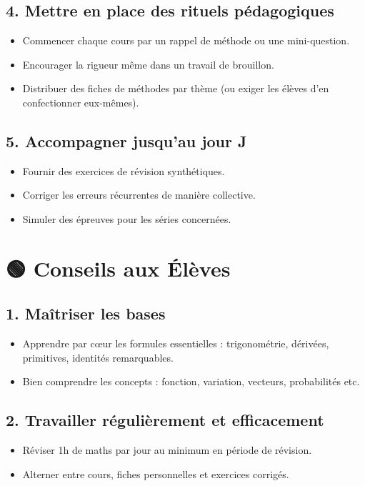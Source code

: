 \subsection*{4. Mettre en place des rituels pédagogiques}
\begin{itemize}[label=--]
    \item Commencer chaque cours par un rappel de méthode ou une mini-question.
    \item Encourager la rigueur même dans un travail de  brouillon.
    \item Distribuer des fiches de méthodes par thème (ou exiger les élèves d'en confectionner eux-mêmes).
\end{itemize}

\subsection*{5. Accompagner jusqu’au jour J}
\begin{itemize}[label=--]
    \item Fournir  des exercices de révision synthétiques.
    \item Corriger les erreurs récurrentes de manière collective.
    \item Simuler des épreuves  pour les séries concernées.
\end{itemize}

\section*{🟢 Conseils aux Élèves}

\subsection*{1. Maîtriser les bases}
\begin{itemize}[label=--]
    \item Apprendre par cœur les formules essentielles : trigonométrie, dérivées, primitives, identités remarquables.
    \item Bien comprendre les concepts : fonction, variation, vecteurs, probabilités etc.
\end{itemize}

\subsection*{2. Travailler régulièrement et efficacement}
\begin{itemize}[label=--]
    \item Réviser 1h de maths par jour au minimum en période de révision.
    \item Alterner entre cours, fiches personnelles et exercices corrigés.
\end{itemize}

